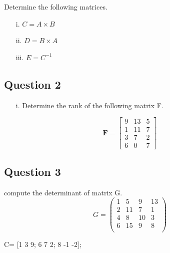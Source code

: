 \documentclass[a4paper,12pt]{article}
\begin{document}
Determine the following matrices.
\begin{itemize}
\item[i.] $C = A \times B$
\item[ii.] $D = B \times A$
\item[iii.] $E = C^{-1}$
\end{itemize}

\subsection*{Question 2}
\begin{itemize}
\item[i.] Determine the rank of the following matrix F.
\end{itemize}
\[\mathbf{F} = \begin{bmatrix}
9 & 13 & 5 \\
1 & 11 & 7 \\
3 & 7 & 2 \\
6 & 0 & 7 \end{bmatrix}\]

\subsection*{Question 3}
compute the determinant of matrix G.
\[G = \left(
\begin{array}{cccc}
1 & 5 & 9 & 13 \\
2 & 11 & 7 & 1 \\
4 & 8 & 10 & 3 \\
6 & 15 & 9 & 8 \\
\end{array}
\right)\]

C= [1 3 9; 6 7 2; 8 -1 -2];
\end{document}
